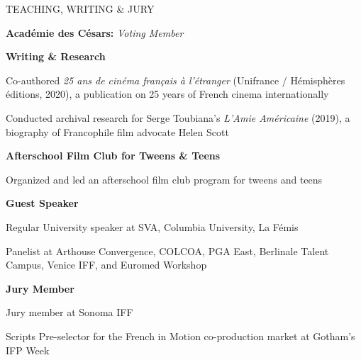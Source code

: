 \begin{rubric}{TEACHING, WRITING \& JURY}

  \entry*[2022-present]%
  \textbf{Acad\'emie des C\'esars:} \textit{Voting Member}

  \entry*[2019-2020]%
  \textbf{Writing \& Research}
  \par
  \begin{cvitems}
    \item Co-authored \textit{25 ans de cin\'ema fran\c{c}ais \`a l'\'etranger} (Unifrance /
      H\'emisph\`eres \'editions, 2020), a publication on 25 years of French cinema
      internationally
    \item Conducted archival research for Serge Toubiana's \textit{L'Amie Am\'ericaine} (2019), a
      biography of Francophile film advocate Helen Scott
  \end{cvitems}

  \entry*[2019-2023]%
  \textbf{Afterschool Film Club for Tweens \& Teens}
  \par
  \begin{cvitems}
    \item Organized and led an afterschool film club program for tweens and teens
  \end{cvitems}

  \entry*[2011-present]%
  \textbf{Guest Speaker}
  \par
  \begin{cvitems}
    \item Regular University speaker at SVA, Columbia University, La F\'emis
    \item Panelist at Arthouse Convergence, COLCOA, PGA East, Berlinale Talent Campus, Venice
      IFF, and Euromed Workshop
  \end{cvitems}

  \entry*[2016-2022]%
  \textbf{Jury Member}
  \par
  \begin{cvitems}
    \item Jury member at Sonoma IFF
    \item Scripts Pre-selector for the French in Motion co-production market at Gotham's IFP Week
  \end{cvitems}

\end{rubric}
